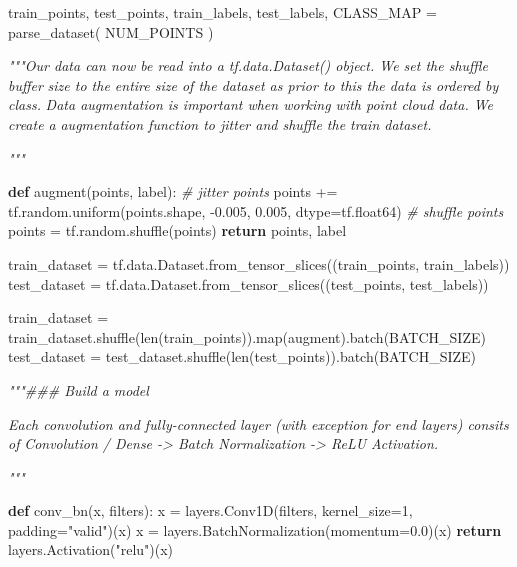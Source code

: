 \documentclass[
  12pt,
  a4paper,
]{article}
\newenvironment{Shaded}{}{}
\newcommand{\BuiltInTok}[1]{#1}
\newcommand{\CommentTok}[1]{\textcolor[rgb]{0.38,0.63,0.69}{\textit{#1}}}
\newcommand{\ControlFlowTok}[1]{\textcolor[rgb]{0.00,0.44,0.13}{\textbf{#1}}}
\newcommand{\DecValTok}[1]{\textcolor[rgb]{0.25,0.63,0.44}{#1}}
\newcommand{\FloatTok}[1]{\textcolor[rgb]{0.25,0.63,0.44}{#1}}
\newcommand{\KeywordTok}[1]{\textcolor[rgb]{0.00,0.44,0.13}{\textbf{#1}}}
\newcommand{\NormalTok}[1]{#1}
\newcommand{\OperatorTok}[1]{\textcolor[rgb]{0.40,0.40,0.40}{#1}}
\newcommand{\StringTok}[1]{\textcolor[rgb]{0.25,0.44,0.63}{#1}}
\begin{document}
\begin{Shaded}
\begin{Highlighting}[]
\NormalTok{train\_points, test\_points, train\_labels, test\_labels, CLASS\_MAP }\OperatorTok{=}\NormalTok{ parse\_dataset(}
\NormalTok{    NUM\_POINTS}
\NormalTok{)}

\CommentTok{"""Our data can now be read into a \textasciigrave{}tf.data.Dataset()\textasciigrave{} object. We set the shuffle buffer}
\CommentTok{size to the entire size of the dataset as prior to this the data is ordered by class.}
\CommentTok{Data augmentation is important when working with point cloud data. We create a}
\CommentTok{augmentation function to jitter and shuffle the train dataset.}

\CommentTok{"""}

\KeywordTok{def}\NormalTok{ augment(points, label):}
    \CommentTok{\# jitter points}
\NormalTok{    points }\OperatorTok{+=}\NormalTok{ tf.random.uniform(points.shape, }\OperatorTok{{-}}\FloatTok{0.005}\NormalTok{, }\FloatTok{0.005}\NormalTok{, dtype}\OperatorTok{=}\NormalTok{tf.float64)}
    \CommentTok{\# shuffle points}
\NormalTok{    points }\OperatorTok{=}\NormalTok{ tf.random.shuffle(points)}
    \ControlFlowTok{return}\NormalTok{ points, label}


\NormalTok{train\_dataset }\OperatorTok{=}\NormalTok{ tf.data.Dataset.from\_tensor\_slices((train\_points, train\_labels))}
\NormalTok{test\_dataset }\OperatorTok{=}\NormalTok{ tf.data.Dataset.from\_tensor\_slices((test\_points, test\_labels))}

\NormalTok{train\_dataset }\OperatorTok{=}\NormalTok{ train\_dataset.shuffle(}\BuiltInTok{len}\NormalTok{(train\_points)).}\BuiltInTok{map}\NormalTok{(augment).batch(BATCH\_SIZE)}
\NormalTok{test\_dataset }\OperatorTok{=}\NormalTok{ test\_dataset.shuffle(}\BuiltInTok{len}\NormalTok{(test\_points)).batch(BATCH\_SIZE)}

\CommentTok{"""\#\#\# Build a model}

\CommentTok{Each convolution and fully{-}connected layer (with exception for end layers) consits of}
\CommentTok{Convolution / Dense {-}\textgreater{} Batch Normalization {-}\textgreater{} ReLU Activation.}

\CommentTok{"""}

\KeywordTok{def}\NormalTok{ conv\_bn(x, filters):}
\NormalTok{    x }\OperatorTok{=}\NormalTok{ layers.Conv1D(filters, kernel\_size}\OperatorTok{=}\DecValTok{1}\NormalTok{, padding}\OperatorTok{=}\StringTok{"valid"}\NormalTok{)(x)}
\NormalTok{    x }\OperatorTok{=}\NormalTok{ layers.BatchNormalization(momentum}\OperatorTok{=}\FloatTok{0.0}\NormalTok{)(x)}
    \ControlFlowTok{return}\NormalTok{ layers.Activation(}\StringTok{"relu"}\NormalTok{)(x)}



\end{Highlighting}
\end{Shaded}
\end{document}
